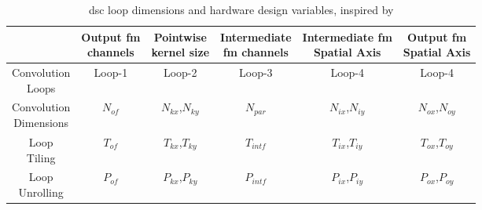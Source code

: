 %
\begin{table}[H]
    \centering
    \begin{tabular}{c|c|c|c|c|c}
    \hline \hline
    & \makecell{Output \acrshort{fm} \\ channels} & \makecell{Pointwise \\ kernel size} & \makecell{Intermediate\\\acrshort{fm} channels} & \makecell{Intermediate \acrshort{fm} \\ Spatial Axis} & \makecell{Output \acrshort{fm} \\ Spatial Axis} \\
    \hline
    \makecell{Convolution \\ Loops}     & Loop-1   & Loop-2            & Loop-3     & Loop-4            & Loop-4 \\
    \makecell{Convolution \\ Dimensions}  & $N_{of}$ & $N_{kx}$,$N_{ky}$ & $N_{par}$  & $N_{ix}$,$N_{iy}$ & $N_{ox}$,$N_{oy}$\\
    \makecell{Loop \\ Tiling}          & $T_{of}$ & $T_{kx}$,$T_{ky}$ & $T_{intf}$ & $T_{ix}$,$T_{iy}$ & $T_{ox}$,$T_{oy}$\\
    \makecell{Loop \\ Unrolling}          & $P_{of}$ & $P_{kx}$,$P_{ky}$ & $P_{intf}$ & $P_{ix}$,$P_{iy}$ & $P_{ox}$,$P_{oy}$\\
    \hline \hline
    \end{tabular}
    \caption{\acrshort{dsc} loop dimensions and hardware design variables, inspired by \cite{ma_optimizing_2018}}
    \label{tab:param_dsc}
\end{table}
%
